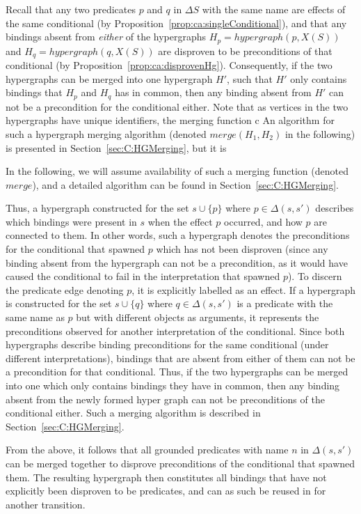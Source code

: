 \documentclass[../Master.tex]{subfiles}
\begin{document}
Recall that any two predicates $p$ and $q$ in $\Delta S$ with the same name are effects of the same conditional (by Proposition~\ref{prop:ca:singleConditional}), and that any bindings absent from \textit{either} of the hypergraphs $H_p = hypergraph(p, X(S))$ and $H_q = hypergraph(q, X(S))$ are disproven to be preconditions of that conditional (by Proposition~\ref{prop:ca:disprovenHg}). Consequently, if the two hypergraphs can be merged into one hypergraph $H'$, such that $H'$ only contains bindings that $H_p$ and $H_q$ has in common, then any binding absent from $H'$ can not be a precondition for the conditional either. Note that as vertices in the two hypergraphs have unique identifiers, the merging function c An algorithm for such a hypergraph merging algorithm (denoted $merge\left(H_1, H_2\right)$ in the following) is presented in Section~\ref{sec:C:HGMerging}, but it is 

In the following, we will assume availability of such a merging function (denoted $merge$), and a detailed algorithm can be found in Section~\ref{sec:C:HGMerging}.

Thus, a hypergraph constructed for the set $s \cup \{ p \}$ where $p \in \Delta \left(s, s' \right)$ describes which bindings were present in $s$ when the effect $p$ occurred, and how $p$ are connected to them. In other words, such a hypergraph denotes the preconditions for the conditional that spawned $p$ which has not been disproven (since any binding absent from the hypergraph can not be a precondition, as it would have caused the conditional to fail in the interpretation that spawned $p$). To discern the predicate edge denoting $p$, it is explicitly labelled as an effect. If a hypergraph is constructed for the set $s \cup \{ q \}$ where $q \in \Delta \left(s,s'\right)$ is a predicate with the same name as $p$ but with different objects as arguments, it represents the preconditions observed for another interpretation of the conditional. Since both hypergraphs describe binding preconditions for the same conditional (under different interpretations), bindings that are absent from either of them can not be a precondition for that conditional. Thus, if the two hypergraphs can be merged into one which only contains bindings they have in common, then any binding absent from the newly formed hyper graph can not be preconditions of the conditional either. Such a merging algorithm is described in Section~\ref{sec:C:HGMerging}.

From the above, it follows that all grounded predicates with name $n$ in $\Delta\left(s, s'\right)$ can be merged together to disprove preconditions of the conditional that spawned them. The resulting hypergraph then constitutes all bindings that have not explicitly been disproven to be predicates, and can as such be reused in for another transition.
\end{document}
